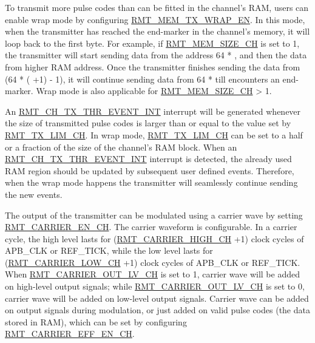 \documentclass[main\_\_EN.tex]{subfiles}
\begin{document}
To transmit more pulse codes than can be fitted in the channel's RAM, users can enable wrap mode by configuring \hyperref[fielddesc:RMTREGMEMTXWRAPEN]{RMT\_MEM\_TX\_WRAP\_EN}. In this mode, when the transmitter has reached the end-marker in the channel's memory, it will loop back to the first byte. For example, if \hyperref[fielddesc:RMTREGMEMSIZECHN]{RMT\_MEM\_SIZE\_CH} is set to 1, the transmitter will start sending data from the address 64 * , and then the data from higher RAM address. Once the transmitter finishes sending the data from (64 * ( +1) - 1), it will continue sending data from 64 *  till encounters an end-marker. Wrap mode is also applicable for \hyperref[fielddesc:RMTREGMEMSIZECHN]{RMT\_MEM\_SIZE\_CH} > 1.

An \hyperref[int:RMTCHnTXTHREVENTINT]{RMT\_CH\_TX\_THR\_EVENT\_INT} interrupt will be generated whenever the size of transmitted pulse codes is larger than or equal to the value set by \hyperref[fielddesc:RMTREGTXLIMCHN]{RMT\_TX\_LIM\_CH}. In wrap mode, \hyperref[fielddesc:RMTREGTXLIMCHN]{RMT\_TX\_LIM\_CH} can be set to a half or a fraction of the size of the channel's RAM block. When an \hyperref[int:RMTCHnTXTHREVENTINT]{RMT\_CH\_TX\_THR\_EVENT\_INT} interrupt is detected, the already used RAM region should be updated by subsequent user defined events. Therefore, when the wrap mode happens the transmitter will seamlessly continue sending the new events.

The output of the transmitter can be modulated using a carrier wave by setting \hyperref[fielddesc:RMTREGCARRIERENCHN]{RMT\_CARRIER\_EN\_CH}. The carrier waveform is configurable. In a carrier cycle, the high level lasts for (\hyperref[fielddesc:RMTREGCARRIERHIGHCHN]{RMT\_CARRIER\_HIGH\_CH} +1) clock cycles of APB\_CLK or REF\_TICK, while the low level lasts for (\hyperref[fielddesc:RMTREGCARRIERLOWCHN]{RMT\_CARRIER\_LOW\_CH} +1) clock cycles of APB\_CLK or REF\_TICK. When \hyperref[fielddesc:RMTREGCARRIEROUTLVCHN]{RMT\_CARRIER\_OUT\_LV\_CH} is set to 1, carrier wave will be added on high-level output signals; while \hyperref[fielddesc:RMTREGCARRIEROUTLVCHN]{RMT\_CARRIER\_OUT\_LV\_CH} is set to 0, carrier wave will be added on low-level output signals. Carrier wave can be added on output signals during modulation, or just added on valid pulse codes (the data stored in RAM), which can be set by configuring \hyperref[fielddesc:RMTREGCARRIEREFFENCHN]{RMT\_CARRIER\_EFF\_EN\_CH}.
\end{document}
